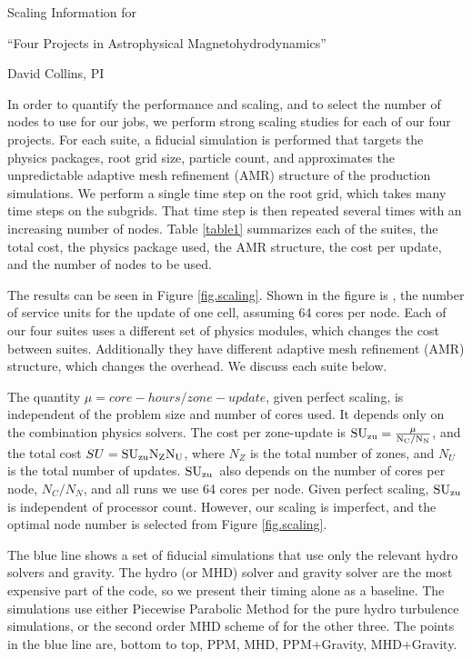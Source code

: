 \documentclass[11pt]{NSF}  %
\begin{document}
\begin{centering}
\begin{LARGE}
Scaling Information for 

``Four Projects in Astrophysical Magnetohydrodynamics''
\end{LARGE}

David Collins, PI

\end{centering}


\pagestyle{plain}


In order to quantify the performance and scaling, and to select the number of
nodes to use for our jobs, we perform strong scaling studies for each of our four
projects.  For each suite, a fiducial simulation is performed
that targets the physics packages, root grid size, particle
count, and approximates the unpredictable adaptive mesh refinement (AMR)
structure of the production simulations.  
We perform a single time step on
the root grid, which takes many time steps on the subgrids. 
That time step is then repeated several times with an increasing number of
nodes.  Table \ref{table1} summarizes each of the suites, the total cost, the
physics package used, the AMR structure, the cost per update, and the number
of nodes to be used.



The results can be seen in Figure \ref{fig.scaling}. Shown in the figure is \suzu, the number of
service units for the update of one cell, assuming 64 cores per node.  Each of
our four suites uses a different set of physics modules, which changes the cost
between suites.  Additionally they have different adaptive mesh refinement (AMR)
structure, which changes the overhead.  We discuss each suite below.

The quantity $\mu= core-hours/zone-update$, given perfect scaling, is
independent of the problem size and number of cores used.  It depends only on the
combination physics solvers.  The cost per zone-update is
$\rm{SU}_{\rm{zu}}=\frac{\mu}{N_C/N_N}$, and the total cost $SU=\rm{SU}_{\rm{zu}} N_Z N_U$, where $N_Z$ is the total number of
zones, and $N_U$ is the total number of updates.  $\rm{SU}_{\rm{zu}}$\ also depends on the
number of cores per node, $N_C/N_N$, and all runs we use 64 cores per node.
Given perfect scaling, $\rm{SU}_{\rm{zu}}$ is independent of
processor count.  However, our scaling is imperfect, and the optimal node number is
selected from  Figure \ref{fig.scaling}.

The blue line shows a set of 
fiducial simulations that use only the
relevant hydro solvers and gravity.  The hydro (or MHD) solver and gravity
solver are the most expensive part of the code, so we present their timing alone
as a baseline.
The simulations use either Piecewise
Parabolic Method \citep{Colella84} for the pure hydro turbulence simulations,
or the second order MHD scheme of \citep{Li08a} for the other three.  The points
in the blue line are, bottom to top, PPM, MHD, PPM+Gravity, MHD+Gravity.  
\end{document}
